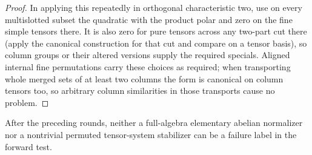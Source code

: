 \begin{proof}
In applying this repeatedly in orthogonal characteristic two, use on every multislotted subset the quadratic with the product polar and zero on the fine simple tensors there. It is also zero for pure tensors across any two-part cut there (apply the canonical construction for that cut and compare on a tensor basis), so column groups or their altered versions supply the required specials. Aligned internal fine permutations carry these choices as required; when transporting whole merged sets of at least two columns the form is canonical on column tensors too, so arbitrary column similarities in those transports cause no problem.

\end{proof}

\begin{proposition}
\label{fb:permuted-tensors}
After the preceding rounds, neither a full-algebra elementary abelian
normalizer nor a nontrivial permuted tensor-system stabilizer can be a failure
label in the forward test.
\end{proposition}
